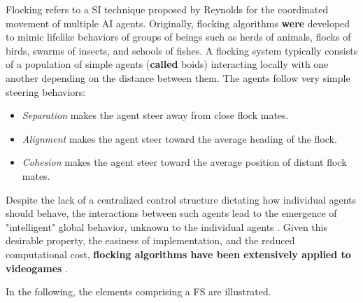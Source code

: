 \documentclass[journal]{IEEEtran}
\begin{document}
Flocking refers to a SI technique proposed by Reynolds \cite{Reynolds87} for the coordinated movement of multiple AI agents. Originally, flocking algorithms \textbf{were} developed to mimic lifelike behaviors of groups of beings such as herds of animals, flocks of birds, swarms of insects, and schools of fishes. A flocking system typically consists of a population of simple agents (\textbf{called} boids) interacting locally with one another depending on the distance between them. The agents follow very simple steering behaviors:

\begin{itemize}
	\item \textit{Separation} makes the agent steer away from close flock mates.
	\item \textit{Alignment} makes the agent steer toward the average heading of the flock.
	\item \textit{Cohesion} makes the agent steer toward the average position of distant flock mates.
\end{itemize} 

Despite the lack of a centralized control structure dictating how
individual agents should behave, the interactions between such agents
lead to the emergence of "intelligent" global behavior, unknown to the
individual agents \cite{SpectorEtAl03}. Given this desirable property,
the easiness of implementation, and the reduced computational cost,
\textbf{flocking algorithms have been extensively applied to videogames}
\cite{Scutt02}.

In the following, the elements comprising a FS are illustrated.
\end{document}
